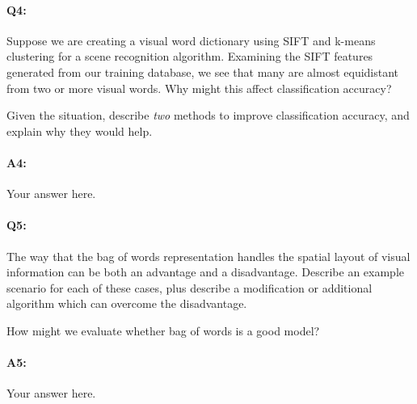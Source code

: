 
\pagebreak
\paragraph{Q4:} Suppose we are creating a visual word dictionary using SIFT and k-means clustering for a scene recognition algorithm. Examining the SIFT features generated from our training database, we see that many are almost equidistant from two or more visual words. Why might this affect classification accuracy?

Given the situation, describe \emph{two} methods to improve classification accuracy, and explain why they would help.

\paragraph{A4:} Your answer here.




\pagebreak
\paragraph{Q5:} The way that the bag of words representation handles the spatial layout of visual information can be both an advantage and a disadvantage. Describe an example scenario for each of these cases, plus describe a modification or additional algorithm which can overcome the disadvantage.

How might we evaluate whether bag of words is a good model?

\paragraph{A5:} Your answer here.






